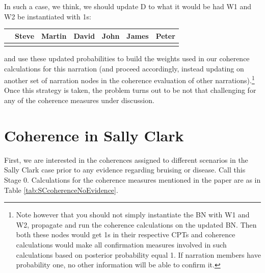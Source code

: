 \documentclass[10pt,]{scrartcl}
\begin{document}
In such a case, we think, we should update \textsf{D} to what it would
be had \textsf{W1} and \textsf{W2} be instantiated with 1s:

\begin{table}[H]
\centering
\begin{tabular}{lrrrrrr}
\toprule
  & Steve & Martin & David & John & James & Peter\\
\midrule
\cellcolor{gray!6}{Pr} & \cellcolor{gray!6}{0.981} & \cellcolor{gray!6}{0.004} & \cellcolor{gray!6}{0.004} & \cellcolor{gray!6}{0.004} & \cellcolor{gray!6}{0.004} & \cellcolor{gray!6}{0.004}\\
\bottomrule
\end{tabular}
\end{table}

\noindent and use these updated probabilities to build the weights used
in our coherence calculations for this narration (and proceed
accordingly, instead updating on another set of narration nodes in the
coherence evaluation of other
narrations).\footnote{Note  however that  you should not simply instantiate the BN with \textsf{W1} and \textsf{W2}, propagate and run the coherence calculations on the updated BN. Then both these nodes would get 1s in their respective CPTs and coherence calculations would make   all  confirmation measures involved in such calculations  based on posterior probability equal 1. If narration members have probability one, no other information will be able to confirm it.}
Once this strategy is taken, the problem turns out to be not that
challenging for any of the coherence measures under discussion.




\section{Coherence in Sally Clark}


First, we are interested in the coherences assigned to different scenarios in the Sally Clark case prior to any evidence regarding bruising or disease. Call this Stage 0. Calculations for the coherence measures mentioned in the paper are as in Table \ref{tab:SCcoherenceNoEvidence}.

\pagebreak 
\end{document}
